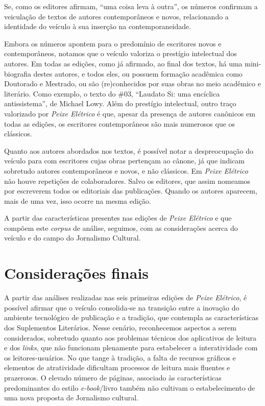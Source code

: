 \documentclass[portuguese]{textolivre}
\begin{document}
Se, como os editores afirmam, “uma coisa leva à outra”, os números confirmam a veiculação de textos de autores contemporâneos e novos, relacionando a identidade do veículo à sua inserção na contemporaneidade.

Embora os números apontem para o predomínio de escritores novos e contemporâneos, notamos que o veículo valoriza o prestígio intelectual dos autores. Em todas as edições, como já afirmado, ao final dos textos, há uma mini-biografia destes autores, e todos eles, ou possuem formação acadêmica como Doutorado e Mestrado, ou são (re)conhecidos por suas obras no meio acadêmico e literário. Como exemplo, o texto do \#03, “Laudato Si: uma encíclica antissistema”, de Michael Lowy.
Além do prestígio intelectual, outro traço valorizado por \textit{Peixe Elétrico} é que, apesar da presença de autores canônicos em todas as edições, os escritores contemporâneos são mais numerosos que os clássicos.

Quanto aos autores abordados nos textos, é possível notar a despreocupação do veículo para com escritores cujas obras pertençam ao cânone, já que indicam sobretudo autores contemporâneos e novos, e não clássicos. Em \textit{Peixe Elétrico} não houve repetições de colaboradores. Salvo os editores, que assim nomeamos por escreverem todos os editoriais das publicações. Quando os autores aparecem, mais de uma vez, isso ocorre na mesma edição.

A partir das características presentes nas edições de \textit{Peixe Elétrico} e que compõem este \textit{corpus} de análise, seguimos, com as considerações acerca do veículo e do campo do Jornalismo Cultural.


\section{Considerações finais}\label{sec-fmt-manuscrito}
A partir das análises realizadas nas seis primeiras edições de \textit{Peixe Elétrico}, é possível afirmar que o veículo consolida-se na transição entre a inovação do ambiente tecnológico de publicação e a tradição, que contempla as características dos Suplementos Literários. Nesse cenário, reconhecemos aspectos a serem considerados, sobretudo quanto aos problemas técnicos dos aplicativos de leitura e dos \textit{links}, que não funcionam plenamente para estabelecer a interatividade com os leitores-usuários. No que tange à tradição, a falta de recursos gráficos e elementos de atratividade dificultam processos de leitura mais fluentes e prazerosos. O elevado número de páginas, associado às características predominantes do estilo \textit{e-book}/livro também não cultivam o estabelecimento de uma nova proposta de Jornalismo cultural.
\end{document}
